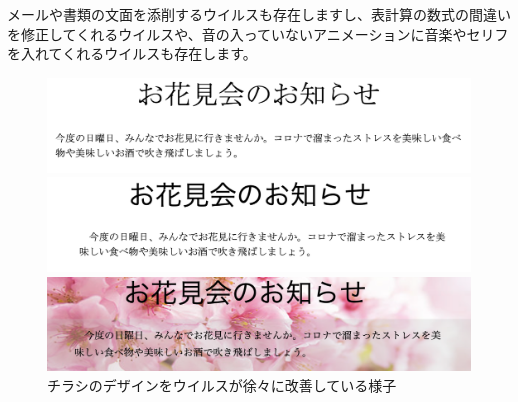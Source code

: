 \documentclass[12pt, unicode]{beamer}
\begin{document}
\begin{frame}

メールや書類の文面を添削するウイルスも存在しますし、表計算の数式の間違いを修正してくれるウイルスや、音の入っていないアニメーションに音楽やセリフを入れてくれるウイルスも存在します。

\begin{figure}[htbp]
  \begin{minipage}[b]{0.2\linewidth}
    \includegraphics[keepaspectratio, scale=0.1]{pic4.png}
  \end{minipage}
  \begin{minipage}[b]{0.1\linewidth}
  \end{minipage}
  \begin{minipage}[b]{0.2\linewidth}
    \includegraphics[keepaspectratio, scale=0.1]{pic5.png}
  \end{minipage}
  \begin{minipage}[b]{0.1\linewidth}
  \end{minipage}
  \begin{minipage}[b]{0.2\linewidth}
    \includegraphics[keepaspectratio, scale=0.1]{pic6.png}
  \end{minipage}
  \caption{チラシのデザインをウイルスが徐々に改善している様子}
\end{figure}



\end{frame}
\end{document}
